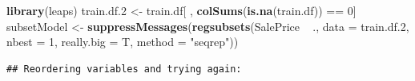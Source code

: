 \documentclass[]{article}
\newenvironment{Shaded}{\begin{snugshade}}{\end{snugshade}}
\newcommand{\KeywordTok}[1]{\textcolor[rgb]{0.13,0.29,0.53}{\textbf{{#1}}}}
\newcommand{\DataTypeTok}[1]{\textcolor[rgb]{0.13,0.29,0.53}{{#1}}}
\newcommand{\DecValTok}[1]{\textcolor[rgb]{0.00,0.00,0.81}{{#1}}}
\newcommand{\FloatTok}[1]{\textcolor[rgb]{0.00,0.00,0.81}{{#1}}}
\newcommand{\StringTok}[1]{\textcolor[rgb]{0.31,0.60,0.02}{{#1}}}
\newcommand{\OtherTok}[1]{\textcolor[rgb]{0.56,0.35,0.01}{{#1}}}
\newcommand{\NormalTok}[1]{{#1}}
\begin{document}
\begin{Shaded}
\begin{Highlighting}[]
\KeywordTok{library}\NormalTok{(leaps)}
\NormalTok{train.df}\FloatTok{.2} \NormalTok{<-}\StringTok{ }\NormalTok{train.df[ , }\KeywordTok{colSums}\NormalTok{(}\KeywordTok{is.na}\NormalTok{(train.df)) ==}\StringTok{ }\DecValTok{0}\NormalTok{]}
\NormalTok{subsetModel <-}\StringTok{ }\KeywordTok{suppressMessages}\NormalTok{(}\KeywordTok{regsubsets}\NormalTok{(SalePrice ~}\StringTok{ }\NormalTok{., }\DataTypeTok{data =} \NormalTok{train.df}\FloatTok{.2}\NormalTok{, }
                          \DataTypeTok{nbest =} \DecValTok{1}\NormalTok{, }\DataTypeTok{really.big =} \NormalTok{T,  }\DataTypeTok{method =} \StringTok{"seqrep"}\NormalTok{))}
\end{Highlighting}
\end{Shaded}

\begin{verbatim}
## Reordering variables and trying again:
\end{verbatim}

\begin{Shaded}
\end{Shaded}
\end{document}
